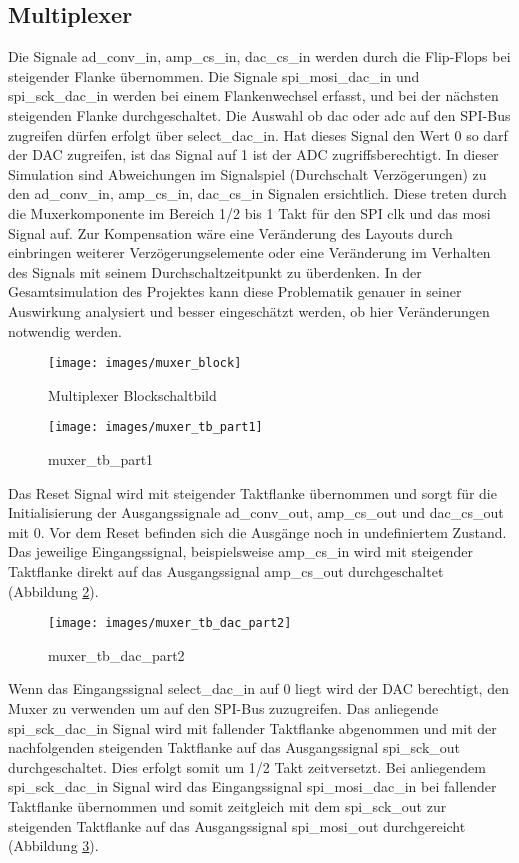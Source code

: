 \subsection{Multiplexer}
Die Signale ad\_conv\_in, amp\_cs\_in, dac\_cs\_in werden durch die Flip-Flops bei steigender Flanke übernommen.
Die Signale spi\_mosi\_dac\_in und spi\_sck\_dac\_in werden bei einem Flankenwechsel erfasst, und bei der nächsten steigenden Flanke durchgeschaltet. Die Auswahl ob dac oder adc auf den SPI-Bus zugreifen dürfen erfolgt über select\_dac\_in. Hat dieses Signal den Wert 0 so darf der DAC zugreifen, ist das Signal auf 1 ist der ADC zugriffsberechtigt.
In dieser Simulation sind Abweichungen im Signalspiel (Durchschalt Verzögerungen) zu den ad\_conv\_in, amp\_cs\_in, dac\_cs\_in Signalen ersichtlich. Diese treten durch die Muxerkomponente im Bereich 1/2 bis 1 Takt für den SPI clk und das mosi Signal auf.
Zur Kompensation wäre eine Veränderung des Layouts durch einbringen weiterer Verzögerungselemente oder eine Veränderung im Verhalten des Signals mit seinem Durchschaltzeitpunkt zu überdenken. In der Gesamtsimulation des Projektes kann diese Problematik genauer in seiner Auswirkung analysiert und besser eingeschätzt werden, ob hier Veränderungen notwendig werden.

\begin{figure}[H]
\centering
\texttt{[image: images/muxer\_block]}
\caption{Multiplexer Blockschaltbild}
\label{fig:muxer_block}
\end{figure}

\begin{figure}[H]
\centering
\texttt{[image: images/muxer\_tb\_part1]}
\caption{muxer\_tb\_part1}
\label{fig:muxer_tb_part1}
\end{figure}

Das Reset Signal wird mit steigender Taktflanke übernommen und sorgt für die Initialisierung der Ausgangssignale ad\_conv\_out, amp\_cs\_out und dac\_cs\_out mit 0.
Vor dem Reset befinden sich die Ausgänge noch in undefiniertem Zustand.
Das jeweilige Eingangssignal, beispielsweise amp\_cs\_in wird mit steigender Taktflanke direkt auf das Ausgangssignal amp\_cs\_out durchgeschaltet (Abbildung \ref{fig:muxer_tb_part1}).


\begin{figure}[H]
\centering
\texttt{[image: images/muxer\_tb\_dac\_part2]}
\caption{muxer\_tb\_dac\_part2}
\label{fig:muxer_tb_dac_part2}
\end{figure}
Wenn das Eingangssignal select\_dac\_in auf 0 liegt wird der DAC berechtigt, den Muxer zu verwenden um auf den SPI-Bus zuzugreifen.
Das anliegende spi\_sck\_dac\_in Signal wird mit fallender Taktflanke abgenommen und mit der nachfolgenden steigenden Taktflanke auf das Ausgangssignal spi\_sck\_out durchgeschaltet.
Dies erfolgt somit um 1/2 Takt zeitversetzt.
Bei anliegendem spi\_sck\_dac\_in Signal wird das Eingangssignal spi\_mosi\_dac\_in bei fallender Taktflanke übernommen und somit zeitgleich mit dem spi\_sck\_out zur steigenden Taktflanke auf das Ausgangssignal spi\_mosi\_out durchgereicht (Abbildung \ref{fig:muxer_tb_dac_part2}).

